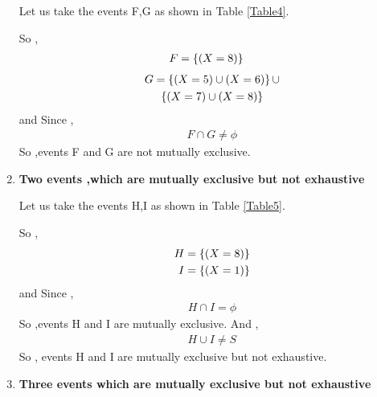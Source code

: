 \documentclass[journal,12pt,twocolumn]{IEEEtran}
\begin{document}
\begin{enumerate}[label=(\roman*)]
    Let us take the events F,G as shown in Table \ref{Table4}.
    \begin{table}[ht!]
        
        \caption{}
        \label{Table4}
    \end{table}
    So ,
    \begin{align}
        F &= \left\{(X=8)\right\}
    \end{align}
    \begin{multline}
	    G =  \left\{(X=5) \cup (X=6)\right\} \cup \\
	         \left\{(X=7) \cup (X=8)\right\}
    \end{multline}
    and Since ,
    \begin{align}
        F \cap G \neq \phi
    \end{align}
    So ,events F and G are not mutually exclusive.
  
    \item \textbf{Two events ,which are mutually exclusive but not exhaustive}
    
    Let us take the events H,I as shown in Table \ref{Table5}.
    \begin{table}[ht!]
        
        \caption{}
        \label{Table5}
    \end{table}
    So ,
    \begin{align}
        H &= \left\{ (X=8) \right\} \\
        I &= \left\{ (X=1) \right\}
    \end{align}
    and Since ,
    \begin{align}
        H \cap I = \phi
    \end{align}
    So ,events H and I are mutually exclusive. And ,
    \begin{align}
        H \cup I \neq S
    \end{align}
    So , events H and I are mutually exclusive but not exhaustive.
    
    \item \textbf{Three events which are mutually exclusive but not exhaustive}
    

\end{enumerate}
\end{document}
